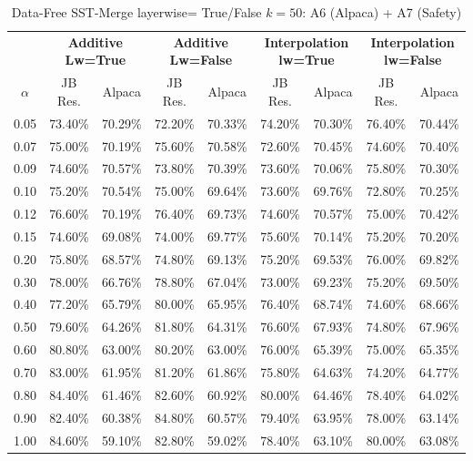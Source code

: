 \begin{table}[h]
\centering
\caption{Data-Free SST-Merge layerwise= True/False $k=50$: A6 (Alpaca) + A7 (Safety)}
\label{tab:res_a6_data_free_sst_50}
\begin{tabular}{c|cc|cc|cc|cc}
\hline
 & \multicolumn{2}{c|}{\textbf{Additive Lw=True}} & \multicolumn{2}{c|}{\textbf{Additive Lw=False}} & \multicolumn{2}{c|}{\textbf{Interpolation lw=True}}& \multicolumn{2}{c}{\textbf{Interpolation lw=False}} \\
$\alpha$ & JB Res. & Alpaca & JB Res. & Alpaca & JB Res. & Alpaca & JB Res. & Alpaca \\
\hline
0.05 & 73.40\% & 70.29\% & 72.20\% & 70.33\% & 74.20\% & 70.30\% & 76.40\% & 70.44\% \\
0.07 & 75.00\% & 70.19\% & 75.60\% & 70.58\% & 72.60\% & 70.45\% & 74.60\% & 70.40\% \\
0.09 & 74.60\% & 70.57\% & 73.80\% & 70.39\% & 73.60\% & 70.06\% & 75.80\% & 70.30\% \\
0.10 & 75.20\% & 70.54\% & 75.00\% & 69.64\% & 73.60\% & 69.76\% & 72.80\% & 70.25\% \\
0.12 & 76.60\% & 70.19\% & 76.40\% & 69.73\% & 74.60\% & 70.57\% & 75.00\% & 70.42\% \\
0.15 & 74.60\% & 69.08\% & 74.00\% & 69.77\% & 75.60\% & 70.14\% & 75.20\% & 70.20\% \\
0.20 & 75.80\% & 68.57\% & 74.80\% & 69.13\% & 75.20\% & 69.53\% & 76.00\% & 69.82\% \\
0.30 & 78.00\% & 66.76\% & 78.80\% & 67.04\% & 73.00\% & 69.23\% & 75.20\% & 69.50\% \\
0.40 & 77.20\% & 65.79\% & 80.00\% & 65.95\% & 76.40\% & 68.74\% & 74.60\% & 68.66\% \\
0.50 & 79.60\% & 64.26\% & 81.80\% & 64.31\% & 76.60\% & 67.93\% & 74.80\% & 67.96\% \\
0.60 & 80.80\% & 63.00\% & 80.20\% & 63.00\% & 76.00\% & 65.39\% & 75.00\% & 65.35\% \\
0.70 & 83.00\% & 61.95\% & 81.20\% & 61.86\% & 75.80\% & 64.63\% & 74.20\% & 64.77\% \\
0.80 & 84.40\% & 61.46\% & 82.60\% & 60.92\% & 80.00\% & 64.46\% & 78.40\% & 64.02\% \\
0.90 & 82.40\% & 60.38\% & 84.80\% & 60.57\% & 79.40\% & 63.95\% & 78.00\% & 63.14\% \\
1.00 & 84.60\% & 59.10\% & 82.80\% & 59.02\% & 78.40\% & 63.10\% & 80.00\% & 63.08\% \\
\hline
\end{tabular}
\end{table}
\FloatBarrier

